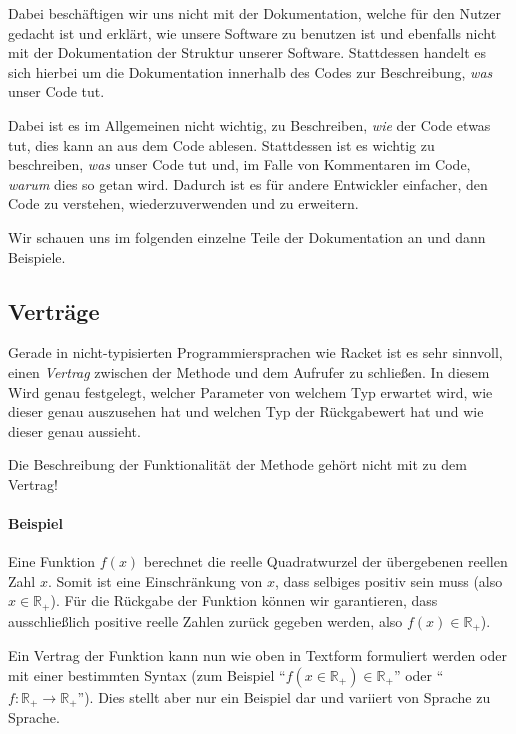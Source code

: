 
Dabei beschäftigen wir uns nicht mit der Dokumentation, welche für den Nutzer gedacht ist und erklärt, wie unsere Software zu benutzen ist und ebenfalls nicht mit der Dokumentation der Struktur unserer Software. Stattdessen handelt es sich hierbei um die Dokumentation innerhalb des Codes zur Beschreibung, \textit{was} unser Code tut.

Dabei ist es im Allgemeinen nicht wichtig, zu Beschreiben, \textit{wie} der Code etwas tut, dies kann an aus dem Code ablesen. Stattdessen ist es wichtig zu beschreiben, \textit{was} unser Code tut und, im Falle von Kommentaren im Code, \textit{warum} dies so getan wird. Dadurch ist es für andere Entwickler einfacher, den Code zu verstehen, wiederzuverwenden und zu erweitern.


Wir schauen uns im folgenden einzelne Teile der Dokumentation an und dann Beispiele.

\subsection{Verträge} \functionalMark \imperativeMark \oopMark

	Gerade in nicht-typisierten Programmiersprachen wie Racket ist es sehr sinnvoll, einen \textit{Vertrag} zwischen der Methode und dem Aufrufer zu schließen. In diesem Wird genau festgelegt, welcher Parameter von welchem Typ erwartet wird, wie dieser genau auszusehen hat und welchen Typ der Rückgabewert hat und wie dieser genau aussieht.
	
	Die Beschreibung der Funktionalität der Methode gehört nicht mit zu dem Vertrag!
	
	\paragraph{Beispiel}
		Eine Funktion \(f(x)\) berechnet die reelle Quadratwurzel der übergebenen reellen Zahl \(x\). Somit ist eine Einschränkung von \(x\), dass selbiges positiv sein muss (also \(x \in \mathbb{R} _ +\)). Für die Rückgabe der Funktion können wir garantieren, dass ausschließlich positive reelle Zahlen zurück gegeben werden, also \(f(x) \in \mathbb{R} _ +\)).
		
		Ein Vertrag der Funktion kann nun wie oben in Textform formuliert werden oder mit einer bestimmten Syntax (zum Beispiel \enquote{\( f(x \in \mathbb{R} _ +) \in \mathbb{R} _ + \)} oder \enquote{\( f : \mathbb{R} _ + \rightarrow \mathbb{R} _ + \)}). Dies stellt aber nur ein Beispiel dar und variiert von Sprache zu Sprache.

